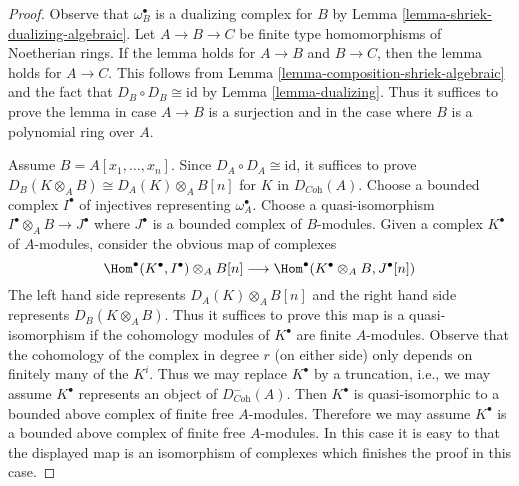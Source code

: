 \begin{proof}
Observe that $\omega_B^\bullet$ is a dualizing complex for $B$ by
Lemma \ref{lemma-shriek-dualizing-algebraic}.
Let $A \to B \to C$ be finite type homomorphisms of Noetherian rings.
If the lemma holds for $A \to B$ and $B \to C$, then the lemma holds for
$A \to C$. This follows from
Lemma \ref{lemma-composition-shriek-algebraic}
and the fact that $D_B \circ D_B \cong \text{id}$ by
Lemma \ref{lemma-dualizing}.
Thus it suffices to prove the lemma in case $A \to B$ is
a surjection and in the case where $B$ is a
polynomial ring over $A$.

\medskip\noindent
Assume $B = A[x_1, \ldots, x_n]$. Since $D_A \circ D_A \cong \text{id}$,
it suffices to prove
$D_B(K \otimes_A B) \cong D_A(K) \otimes_A B[n]$ for $K$
in $D_{\textit{Coh}}(A)$.
Choose a bounded complex $I^\bullet$ of injectives representing
$\omega_A^\bullet$. Choose a quasi-isomorphism
$I^\bullet \otimes_A B \to J^\bullet$ where $J^\bullet$
is a bounded complex of $B$-modules. Given a complex
$K^\bullet$ of $A$-modules, consider the obvious
map of complexes
$$
\Hom^\bullet(K^\bullet, I^\bullet) \otimes_A B[n]
\longrightarrow
\Hom^\bullet(K^\bullet \otimes_A B, J^\bullet[n])
$$
The left hand side represents $D_A(K) \otimes_A B[n]$ and the right hand
side represents $D_B(K \otimes_A B)$. Thus it suffices to prove this
map is a quasi-isomorphism if the cohomology modules
of $K^\bullet$ are finite $A$-modules. Observe that the
cohomology of the complex in degree $r$ (on either side)
only depends on finitely many of the $K^i$. Thus we may
replace $K^\bullet$ by a truncation, i.e., we may assume
$K^\bullet$ represents an object of $D^-_{\textit{Coh}}(A)$.
Then $K^\bullet$ is quasi-isomorphic to a bounded
above complex of finite free $A$-modules.
Therefore we may assume $K^\bullet$ is a bounded
above complex of finite free $A$-modules.
In this case it is easy to that the
displayed map is an isomorphism of complexes which finishes
the proof in this case.


\end{proof}
